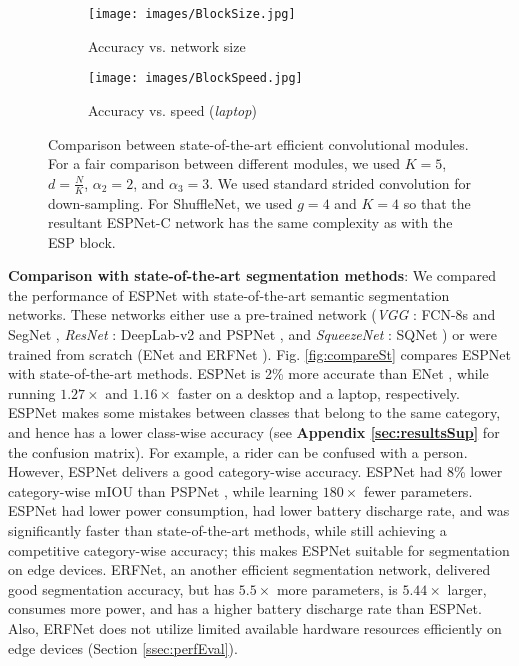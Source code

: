 \documentclass[runningheads]{llncs}
\def\Fig{Fig. }
\begin{document}
\begin{figure}[b!]
\centering
\begin{subfigure}[b]{0.48\columnwidth}
\centering
\texttt{[image: images/BlockSize.jpg]}
\caption{Accuracy vs. network size}
\end{subfigure}
\hfill
\begin{subfigure}[b]{0.48\columnwidth}
\centering
\texttt{[image: images/BlockSpeed.jpg]}
\caption{Accuracy vs. speed (\textit{laptop})}
\end{subfigure}
\caption{Comparison between state-of-the-art efficient convolutional modules. For a fair comparison between different modules, we used $K=5$, $d=\frac{N}{K}$, $\alpha_2=2$, and $\alpha_3=3$. We used standard strided convolution for down-sampling. For ShuffleNet, we used $g=4$ and $K=4$ so that the resultant ESPNet-C network has the same complexity as with the ESP block.}
\label{fig:blockCompare}
\end{figure}

\noindent \textbf{Comparison with state-of-the-art segmentation methods}: We compared the performance of ESPNet with state-of-the-art semantic segmentation networks. These networks either use a pre-trained network (\textit{VGG} \cite{simonyan2014very}: FCN-8s \cite{long2015fully} and SegNet \cite{badrinarayanan2017segnet}, \textit{ResNet} \cite{he2016deep}: DeepLab-v2 \cite{chen2016deeplab} and PSPNet \cite{zhao2017pyramid}, and \textit{SqueezeNet} \cite{iandola2016squeezenet}: SQNet \cite{treml2016speeding}) or were trained from scratch (ENet \cite{paszke2016enet} and ERFNet \cite{romera2018erfnet}). \Fig \ref{fig:compareSt} compares ESPNet with state-of-the-art methods. ESPNet is 2\% more accurate than ENet \cite{paszke2016enet}, while running $1.27\times$ and $1.16\times$ faster on a desktop and a laptop, respectively. ESPNet makes some mistakes between classes that belong to the same category, and hence has a lower class-wise accuracy (see \textbf{Appendix \ref{sec:resultsSup}} for the confusion matrix). For example, a rider can be confused with a person. However, ESPNet delivers a good category-wise accuracy. ESPNet had 8\% lower category-wise mIOU than PSPNet \cite{zhao2017pyramid}, while learning $180\times$ fewer parameters. ESPNet had lower power consumption, had lower battery discharge rate, and was significantly faster than state-of-the-art methods, while still achieving a competitive category-wise accuracy; this makes ESPNet suitable for segmentation on edge devices. ERFNet, an another efficient segmentation network, delivered good segmentation accuracy, but has $5.5\times$ more parameters, is $5.44 \times$ larger, consumes more power, and has a higher battery discharge rate than ESPNet. Also, ERFNet does not utilize limited available hardware resources efficiently on edge devices (Section \ref{ssec:perfEval}).
\end{document}
